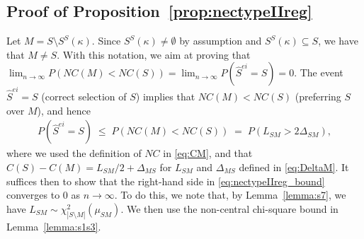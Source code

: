 \documentclass[
  12pt]{article}
\begin{document}
\subsection{Proof of Proposition~\ref{prop:nectypeIIreg}}

Let $M=S\setminus S^{S}(\kappa)$. Since $S^{S}(\kappa)\neq \emptyset$ by assumption and $S^S(\kappa)\subseteq S$, we have that $M\neq S$. With this notation, we aim at proving that $\lim_{n\to \infty}P(NC(M)<NC(S))=\lim_{n\to \infty}P(\hat{S}^{ei}=S)=0$. The event $\hat{S}^{ei}=S$ (correct selection of $S$) implies that $NC(M)< NC(S)$ (preferring $S$ over $M$), and hence 
\begin{align}\label{eq:nectypeIIreg_bound}
P(\hat{S}^{ei}=S)\;\leq\; P\left( NC(M) < NC(S) \right)
\;=\; P(L_{SM}> 2\Delta_{SM}),
\end{align}
where we used the definition of $NC$ in
\eqref{eq:CM}, and that $C(S)-C(M)=L_{SM}/2 + \Delta_{MS}$ for $L_{SM}$ and $\Delta_{MS}$ defined in \eqref{eq:DeltaM}. It suffices then to show that the right-hand side in \eqref{eq:nectypeIIreg_bound} converges to 0 as $n \to \infty$.
To do this, we note that, by Lemma~\ref{lemma:s7}, we have $L_{SM}\sim \chi_{|S\setminus M|}^2(\mu_{SM})$. We then use the non-central chi-square bound in Lemma~\ref{lemma:s1s3}.
\end{document}
